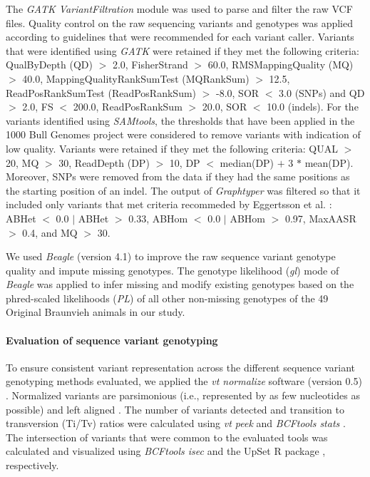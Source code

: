 \documentclass[../main.tex]{subfiles}
\begin{document}
The \emph{GATK VariantFiltration} module was used to parse and filter the raw VCF files. Quality control on the raw sequencing variants and genotypes was applied according to guidelines that were recommended for each variant caller. Variants that were identified using \emph{GATK} were retained if they met the following criteria: QualByDepth (QD) $>$ 2.0, FisherStrand $>$ 60.0, RMSMappingQuality (MQ) $>$ 40.0, MappingQualityRankSumTest (MQRankSum) $>$ 12.5, ReadPosRankSumTest (ReadPosRankSum) $>$ -8.0, SOR $<$ 3.0 (SNPs) and QD $>$ 2.0, FS $<$ 200.0, ReadPosRankSum $>$ 20.0, SOR $<$ 10.0 (indels). For the variants identified using \emph{SAMtools}, the thresholds that have been applied in the 1000 Bull Genomes project \citep{Daetwyler2014} were considered to remove variants with indication of low quality. Variants were retained if they met the following criteria: QUAL $>$ 20, MQ $>$ 30, ReadDepth (DP) $>$ 10, DP $<$ median(DP) $+$ 3 $*$ mean(DP).   
Moreover, SNPs were removed from the data if they had the same positions as the starting position of an indel. The output of \emph{Graphtyper} was filtered so that it included only variants that met criteria recommeded by Eggertsson et al. \citet{eggertsson2017graphtyper}: ABHet $<$ 0.0 $|$ ABHet $>$ 0.33, ABHom $<$ 0.0 $|$ ABHom $>$ 0.97, MaxAASR $>$ 0.4, and MQ $>$ 30. 

We used \emph{Beagle} (version 4.1) \citep{browning2016genotype} to improve the raw sequence variant genotype quality and impute missing genotypes. The genotype likelihood (\emph{gl}) mode of \emph{Beagle} was applied to infer missing and modify existing genotypes based on the phred-scaled likelihoods (\emph{PL}) of all other non-missing genotypes of the 49 Original Braunvieh animals in our study.

\paragraph{Evaluation of sequence variant genotyping}

To ensure consistent variant representation across the different sequence variant genotyping methods evaluated, we applied the \emph{vt normalize} software (version 0.5) \citep{tan2015unified}. Normalized variants are parsimonious (i.e., represented by as few nucleotides as possible) and left aligned \citep{tan2015unified}. The number of variants detected and transition to transversion (Ti/Tv) ratios were calculated using \emph{vt peek} \citep{tan2015unified} and \emph{BCFtools stats} \citep{li2011statistical}. The intersection of variants that were common to the evaluated tools was calculated and visualized using \emph{BCFtools isec} \citep{li2011statistical} and the UpSet R package \citep{conway2017upsetr}, respectively.
\end{document}
